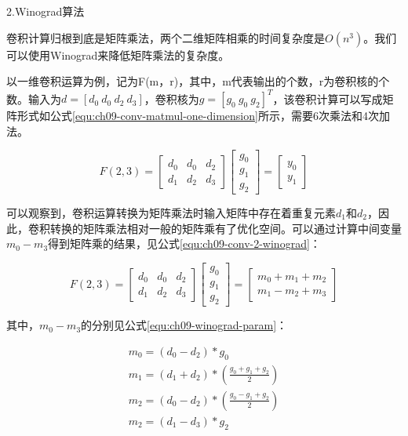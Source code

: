 2.Winograd算法

卷积计算归根到底是矩阵乘法，两个二维矩阵相乘的时间复杂度是$O(n^3)$。我们可以使用Winograd来降低矩阵乘法的复杂度。

以一维卷积运算为例，记为F(m，r)，其中，m代表输出的个数，r为卷积核的个数。输入为$d=[d_0 \ d_0 \ d_2 \ d_3]$，卷积核为$g=[g_0 \ g_0 \ g_2]^T$，该卷积计算可以写成矩阵形式如公式\ref{equ:ch09-conv-matmul-one-dimension}所示，需要6次乘法和4次加法。

\begin{equation}\label{equ:ch09-conv-matmul-one-dimension}
F(2, 3)=
\left[ \begin{matrix} d_0 & d_0 & d_2 \\ d_1 & d_2 & d_3 \end{matrix} \right] \left[ \begin{matrix} g_0 \\ g_1 \\ g_2 \end{matrix} \right]=
\left[ \begin{matrix} y_0 \\ y_1 \end{matrix} \right]
\end{equation}

可以观察到，卷积运算转换为矩阵乘法时输入矩阵中存在着重复元素$d_1$和$d_2$，因此，卷积转换的矩阵乘法相对一般的矩阵乘有了优化空间。可以通过计算中间变量$m_0-m_3$得到矩阵乘的结果，见公式\ref{equ:ch09-conv-2-winograd}：

\begin{equation}\label{equ:ch09-conv-2-winograd}
F(2, 3)=
\left[ \begin{matrix} d_0 & d_0 & d_2 \\ d_1 & d_2 & d_3 \end{matrix} \right] \left[ \begin{matrix} g_0 \\ g_1 \\ g_2 \end{matrix} \right]=
\left[ \begin{matrix} m_0+m_1+m_2 \\ m_1-m_2+m_3 \end{matrix} \right]
\end{equation}

其中，$m_0-m_3$的分别见公式\ref{equ:ch09-winograd-param}：

\begin{equation}\label{equ:ch09-winograd-param}
\begin{aligned}
m_0=(d_0-d_2)*g_0 \\
m_1=(d_1+d_2)*(\frac{g_0+g_1+g_2}{2}) \\
m_2=(d_0-d_2)*(\frac{g_0-g_1+g_2}{2}) \\
m_2=(d_1-d_3)*g_2
\end{aligned}
\end{equation}

